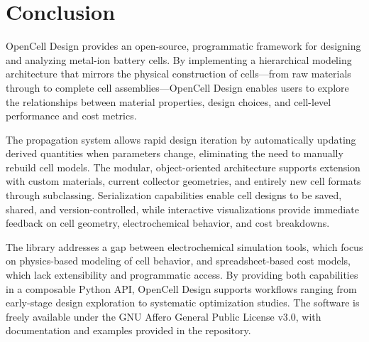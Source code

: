 \documentclass[12pt]{article}
\begin{document}
\section{Conclusion}

OpenCell Design provides an open-source, programmatic framework for designing and analyzing metal-ion battery cells. By implementing a hierarchical modeling architecture that mirrors the physical construction of cells---from raw materials through to complete cell assemblies---OpenCell Design enables users to explore the relationships between material properties, design choices, and cell-level performance and cost metrics.

The propagation system allows rapid design iteration by automatically updating derived quantities when parameters change, eliminating the need to manually rebuild cell models. The modular, object-oriented architecture supports extension with custom materials, current collector geometries, and entirely new cell formats through subclassing. Serialization capabilities enable cell designs to be saved, shared, and version-controlled, while interactive visualizations provide immediate feedback on cell geometry, electrochemical behavior, and cost breakdowns.

The library addresses a gap between electrochemical simulation tools, which focus on physics-based modeling of cell behavior, and spreadsheet-based cost models, which lack extensibility and programmatic access. By providing both capabilities in a composable Python API, OpenCell Design supports workflows ranging from early-stage design exploration to systematic optimization studies. The software is freely available under the GNU Affero General Public License v3.0, with documentation and examples provided in the repository.



\end{document}
